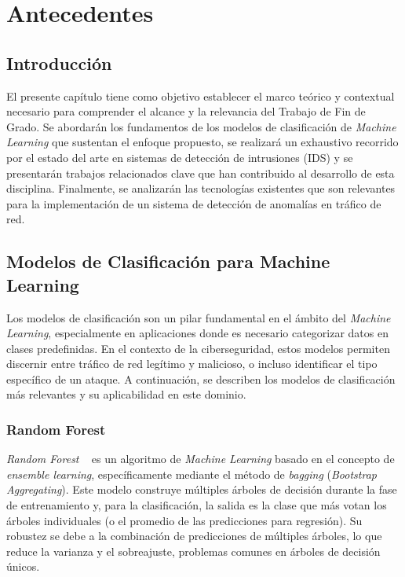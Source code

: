 \chapter{Antecedentes}
\section{Introducción}
El presente capítulo tiene como objetivo establecer el marco teórico y contextual necesario para comprender el alcance y la relevancia del Trabajo de Fin de Grado. Se abordarán los fundamentos de los modelos de clasificación de \textit{Machine Learning} que sustentan el enfoque propuesto, se realizará un exhaustivo recorrido por el estado del arte en sistemas de detección de intrusiones (IDS) y se presentarán trabajos relacionados clave que han contribuido al desarrollo de esta disciplina. Finalmente, se analizarán las tecnologías existentes que son relevantes para la implementación de un sistema de detección de anomalías en tráfico de red.

\section{Modelos de Clasificación para Machine Learning}

Los modelos de clasificación son un pilar fundamental en el ámbito del \textit{Machine Learning}, especialmente en aplicaciones donde es necesario categorizar datos en clases predefinidas. En el contexto de la ciberseguridad, estos modelos permiten discernir entre tráfico de red legítimo y malicioso, o incluso identificar el tipo específico de un ataque. A continuación, se describen los modelos de clasificación más relevantes y su aplicabilidad en este dominio.

\subsection{Random Forest}
\textit{Random Forest} ~\cite{breiman2001random} es un algoritmo de \textit{Machine Learning} basado en el concepto de \textit{ensemble learning}, específicamente mediante el método de \textit{bagging} (\textit{Bootstrap Aggregating}). Este modelo construye múltiples árboles de decisión durante la fase de entrenamiento y, para la clasificación, la salida es la clase que más votan los árboles individuales (o el promedio de las predicciones para regresión). Su robustez se debe a la combinación de predicciones de múltiples árboles, lo que reduce la varianza y el sobreajuste, problemas comunes en árboles de decisión únicos.

